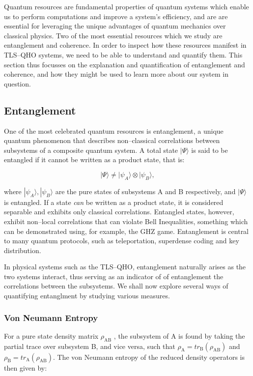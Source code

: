 \documentclass[12pt]{article}
\begin{document}
Quantum resources are fundamental properties of quantum systems which enable us to perform computations and improve a system's efficiency, and are are essential for leveraging the unique advantages of quantum mechanics over classical physics. Two of the most essential resources which we study are entanglement and coherence. In order to inspect how these resources manifest in TLS--QHO systems, we need to be able to understand and quantify them. This section thus focusses on the explanation and quantification of entanglement and coherence, and how they might be used to learn more about our system in question. 

\subsection{Entanglement}

One of the most celebrated quantum resources is entanglement, a unique quantum phenomenon that describes non--classical correlations between subsystems of a composite quantum system. A total state $|\Psi\rangle$ is said to be entangled if it cannot be written as a product state, that is:

\begin{equation}
    |\Psi\rangle \neq |\psi_A\rangle \otimes |\psi_B\rangle,
\end{equation}

where $|\psi_A\rangle, |\psi_B\rangle$ are the pure states of subsystems A and B respectively, and $|\Psi\rangle$ is entangled. If a state \textit{can} be written as a product state, it is considered separable and exhibits only classical correlations. Entangled states, however, exhibit non--local correlations that can violate Bell Inequalities, something which can be demonstrated using, for example, the GHZ game. Entanglement is central to many quantum protocols, such as teleportation, superdense coding and key distribution. 

In physical systems such as the TLS--QHO, entanglement naturally arises as the two systems interact, thus serving as an indicator of of entanglement the correlations between the subsystems. We shall now explore several ways of quantifying entanglment by studying various measures. 

\subsubsection{Von Neumann Entropy}

For a pure state density matrix $\rho_{\scriptscriptstyle \text{AB}}$ \cite{Entanglement1999-Overview_&REE}, the subsystem of A is  found by taking the partial trace over subsystem B, and vice versa, such that $\rho_{\scriptscriptstyle \text{A}} = tr_{\scriptscriptstyle \text{B}}(\rho_{\scriptscriptstyle \text{AB}})$ and $\rho_{\scriptscriptstyle \text{B}} = tr_{\scriptscriptstyle \text{A}}(\rho_{\scriptscriptstyle \text{AB}})$. The von Neumann entropy of the reduced density operators is then given by:
\end{document}

